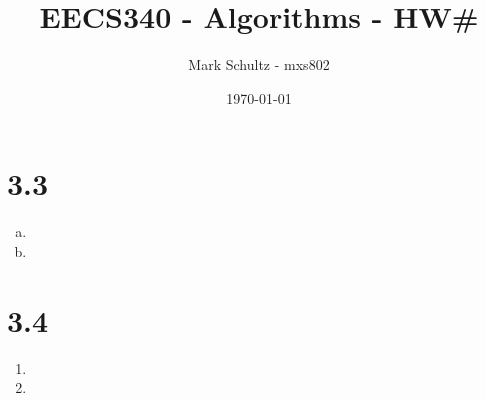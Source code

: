 \documentclass{article}
\begin{document}
\title{EECS340 - Algorithms - HW\#}
\date{\today}
\author{Mark Schultz - mxs802}
\maketitle
\vspace{2in}

\section*{3.3}
\begin{enumerate}[a)]
\item 
\item 
\end{enumerate}


\section*{3.4}
\begin{enumerate}
\item 
\item 

\end{enumerate}
\end{document}
